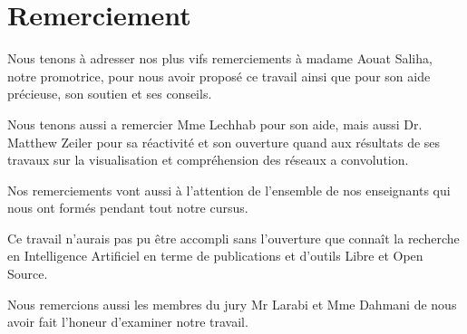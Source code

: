 
\chapter*{Remerciement} %


	Nous tenons à adresser nos plus vifs remerciements à madame Aouat Saliha, notre promotrice, pour nous avoir proposé ce travail ainsi que pour son aide précieuse, son soutien et ses conseils. 

	Nous tenons aussi a remercier Mme Lechhab pour son aide, mais aussi Dr. Matthew Zeiler pour sa réactivité et son ouverture quand aux résultats de ses travaux sur la visualisation et compréhension des réseaux a convolution.

	Nos remerciements vont aussi à l'attention de l'ensemble de nos enseignants qui nous ont formés pendant tout notre cursus.

	Ce travail n'aurais pas pu être accompli sans l'ouverture que connaît la recherche en Intelligence Artificiel en terme de publications et d'outils Libre et Open Source.
	
	Nous remercions aussi les membres du jury Mr Larabi et Mme Dahmani de nous avoir fait l'honeur d'examiner notre travail.



